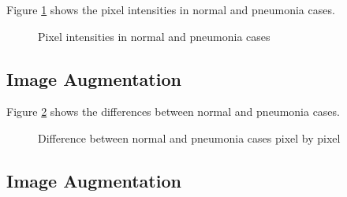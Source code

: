 \documentclass[9pt,twocolumn,twoside]{opticajnl}
\begin{document}
Figure \ref{fig:pneumonia_and_normal_distribution} shows the pixel intensities in normal and pneumonia cases.

\begin{figure}[ht]
\centering
{}
\caption{Pixel intensities in normal and pneumonia cases}
\label{fig:pneumonia_and_normal_distribution}
\end{figure}

\subsection{Image Augmentation}

Figure \ref{fig:differences_subplot} shows the differences between normal and pneumonia cases.

\begin{figure}[ht]
\centering
{}
\caption{Difference between normal and pneumonia cases pixel by pixel}
\label{fig:differences_subplot}
\end{figure}

\subsection{Image Augmentation}
\end{document}
